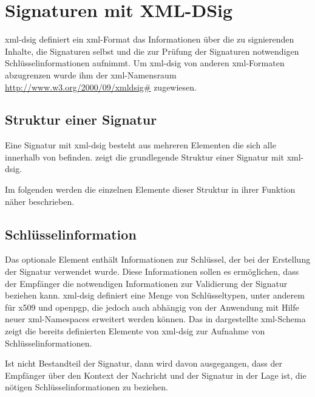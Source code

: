 
\chapter{Signaturen mit XML-DSig}
\label{chap:XML-DSig}
\gls{xml-dsig} definiert ein \gls{xml}-Format das Informationen über die zu signierenden Inhalte, die Signaturen selbst und die zur Prüfung der Signaturen
notwendigen Schlüsselinformationen aufnimmt. Um \gls{xml-dsig} von anderen \gls{xml}-Formaten abzugrenzen wurde ihm der \gls{xml}-Namensraum
\url{http://www.w3.org/2000/09/xmldsig#} zugewiesen. 

\section{Struktur einer Signatur}
Eine Signatur mit \gls{xml-dsig} besteht aus mehreren Elementen die sich alle innerhalb von  befinden.  zeigt
die grundlegende Struktur einer Signatur mit \gls{xml-dsig}.



Im folgenden werden die einzelnen Elemente dieser Struktur in ihrer Funktion näher beschrieben. 

\section{Schlüsselinformation}
Das optionale Element  enthält Informationen zur Schlüssel, der bei der Erstellung der Signatur verwendet wurde. Diese Informationen sollen es
ermöglichen, dass der Empfänger die notwendigen Informationen zur Validierung der Signatur beziehen kann. \gls{xml-dsig} definiert eine Menge von
Schlüsseltypen, unter anderem für \gls{x509} und \gls{openpgp}, die jedoch auch abhängig von der Anwendung mit Hilfe neuer \gls{xml}-Namespaces erweitert werden
können. Das in  dargestellte \gls{xml}-Schema zeigt die bereits definierten Elemente von \gls{xml-dsig} zur Aufnahme von
Schlüsselinformationen.



Ist  nicht Bestandteil der Signatur, dann wird davon ausgegangen, dass der Empfänger über den Kontext der Nachricht und der Signatur in der
Lage ist, die nötigen Schlüsselinformationen zu beziehen.

